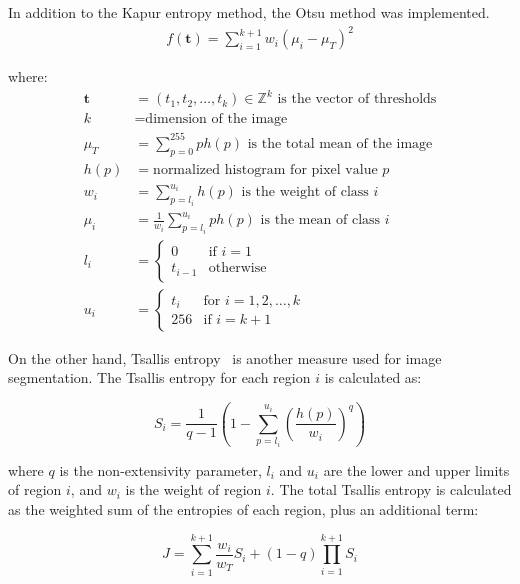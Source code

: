 \documentclass{elsarticle}
\begin{document}
\noindent In addition to the Kapur entropy method, the Otsu method was implemented.
\begin{equation}
\begin{gathered}
f(\mathbf{t})=\sum_{i=1}^{k+1} w_i (\mu_i - \mu_T)^2 
\end{gathered}
\end{equation}

where:
\begin{equation}
\begin{aligned}
\mathbf{t} &= (t_1, t_2, \dots, t_k) \in \mathbb{Z}^k \text{ is the vector of thresholds} \\
k &= \text{dimension of the image} \\
\mu_T &= \sum_{p=0}^{255} p h(p) \text{ is the total mean of the image} \\
h(p) &= \text{normalized histogram for pixel value } p \\
w_i &= \sum_{p=l_i}^{u_i} h(p) \text{ is the weight of class } i \\
\mu_i &= \frac{1}{w_i} \sum_{p=l_i}^{u_i} p h(p) \text{ is the mean of class } i \\
l_i &= \begin{cases}
0 & \text{if } i = 1 \\
t_{i-1} & \text{otherwise}
\end{cases} \\
u_i &= \begin{cases}
t_i & \text{for } i = 1, 2, \dots, k \\
256 & \text{if } i = k+1
\end{cases}
\end{aligned}
\end{equation}

\noindent On the other hand, Tsallis entropy~\cite{KaushikPancholi2023} is another measure used for image segmentation. The Tsallis entropy for each region $i$ is calculated as:

\begin{equation}
S_i = \frac{1}{q-1}\left(1 - \sum_{p=l_i}^{u_i} \left(\frac{h(p)}{w_i}\right)^q\right)
\end{equation}

\noindent where $q$ is the non-extensivity parameter, $l_i$ and $u_i$ are the lower and upper limits of region $i$, and $w_i$ is the weight of region $i$. The total Tsallis entropy is calculated as the weighted sum of the entropies of each region, plus an additional term:

\begin{equation}
J = \sum_{i=1}^{k+1} \frac{w_i}{w_T} S_i + (1-q) \prod_{i=1}^{k+1} S_i
\end{equation}
\end{document}
